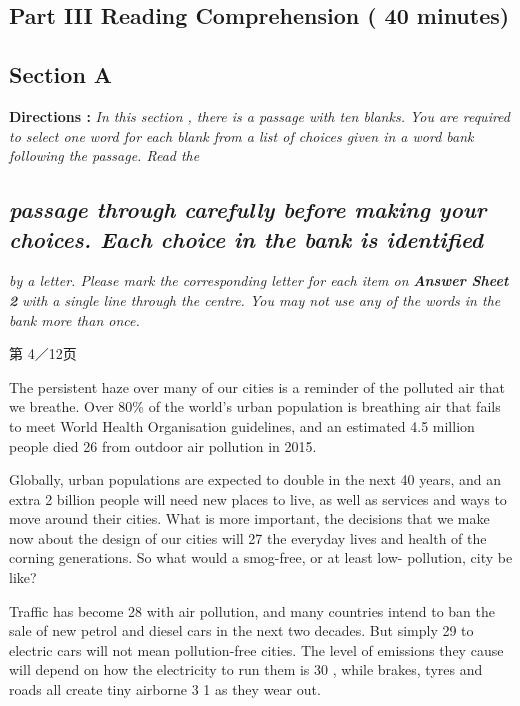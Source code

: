 \documentclass[UTF8,11pt]{ctexart}
\begin{document}
\subsection*{\textbf{Part III} \textbf{Reading Comprehension} \textbf{( 40 minutes)}}


\subsection*{\textbf{Section A}}


\textbf{Directions : }\textit{In this section , there is a passage with ten blanks. You are required to select one word for} \textit{each blank from a list of choices given in a word bank following the passage. Read the}


\subsection*{\textit{passage through carefully before making your choices. Each choice in the bank is identified}}


\textit{by a letter. Please mark the corresponding letter for each item on }\textbf{\textit{Answer Sheet 2 }}\textit{with a} \textit{single line through the centre. You may not use any of the words in the bank more than once.}


第 4／12页


The persistent haze over many of our cities is a reminder of the polluted air that we breathe. Over 80\% of the world's urban population is breathing air that fails to meet World Health Organisation guidelines, and an estimated 4.5 million people died 26 from outdoor air pollution in 2015.


Globally, urban populations are expected to double in the next 40 years, and an extra 2 billion people will need new places to live, as well as services and ways to move around their cities. What is more important, the decisions that we make now about the design of our cities will 27 the everyday lives and health of the corning generations. So what would a smog-free, or at least low- pollution, city be like?


Traffic has become 28 with air pollution, and many countries intend to ban the sale of new petrol and diesel cars in the next two decades. But simply 29 to electric cars will not mean pollution-free cities. The level of emissions they cause will depend on how the electricity to run them is 30 , while brakes, tyres and roads all create tiny airborne 3 1 as they wear out.
\end{document}
